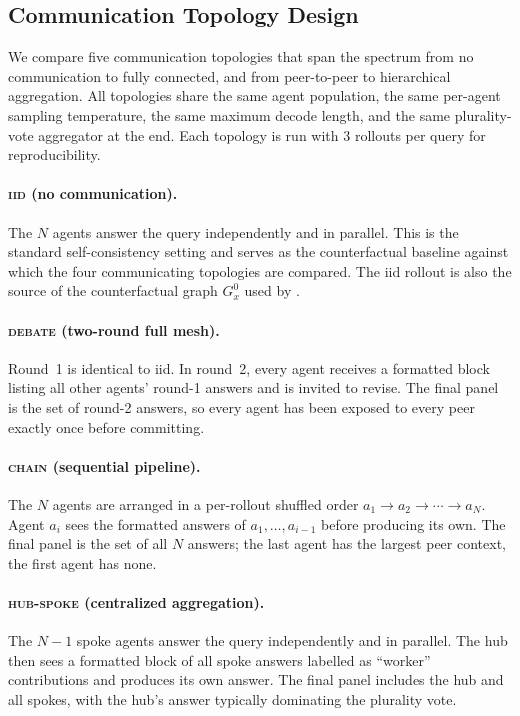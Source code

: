 \subsection{Communication Topology Design}
\label{app:topology-design}

We compare five communication topologies that span the spectrum
from no communication to fully connected, and from peer-to-peer to
hierarchical aggregation. All topologies share the same agent
population, the same per-agent sampling temperature,
the same maximum decode length, and the same
plurality-vote aggregator at the end. Each topology is run with $3$ rollouts per query for reproducibility.

\paragraph{\textsc{iid} (no communication).}
The $N$ agents answer the query independently and in parallel.
This is the standard self-consistency setting and serves as the counterfactual baseline against which the four communicating topologies are compared. The iid rollout is also the source of the counterfactual graph $G^{0}_{x}$ used by \methodname{}.

\paragraph{\textsc{debate} (two-round full mesh).}
Round~1 is identical to iid. In round~2, every agent receives a formatted block listing all other agents' round-1 answers and is invited to revise. The final panel is the set of round-2 answers, so every agent has been exposed to every peer exactly once before committing.

\paragraph{\textsc{chain} (sequential pipeline).}
The $N$ agents are arranged in a per-rollout shuffled order
$a_{1} \to a_{2} \to \cdots \to a_{N}$. Agent $a_{i}$ sees the
formatted answers of $a_{1}, \ldots, a_{i-1}$ before producing its own. The final panel is the set of all $N$ answers; the last agent has the largest peer context, the first agent has none.

\paragraph{\textsc{hub-spoke} (centralized aggregation).}
The $N{-}1$ spoke agents answer the query independently and in
parallel. The hub then sees a formatted block of all spoke answers labelled as ``worker'' contributions and produces its own answer. The final panel includes the hub and all spokes, with the hub's answer typically dominating the plurality vote.

